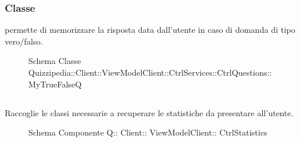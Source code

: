 \subsubsection{Classe }
permette di memorizzare la risposta data dall'utente in caso di domanda di tipo vero/falso.
\begin{figure}[H]
\centering
\noindent{}
\caption[Schema Classe MyTrueFalseQ]{Schema Classe Quizzipedia::Client::ViewModelClient::CtrlServices::CtrlQuestions::MyTrueFalseQ}
\end{figure}
\subsection{}
Raccoglie le classi necessarie a recuperare le statistiche da presentare all'utente.
\begin{figure}[H]
\centering
\noindent{}
\caption[Schema Componente Quizzipedia::Client::ViewModelClient::CtrlStatistics]{Schema Componente Q:: Client:: ViewModelClient:: CtrlStatistics}
\end{figure}
